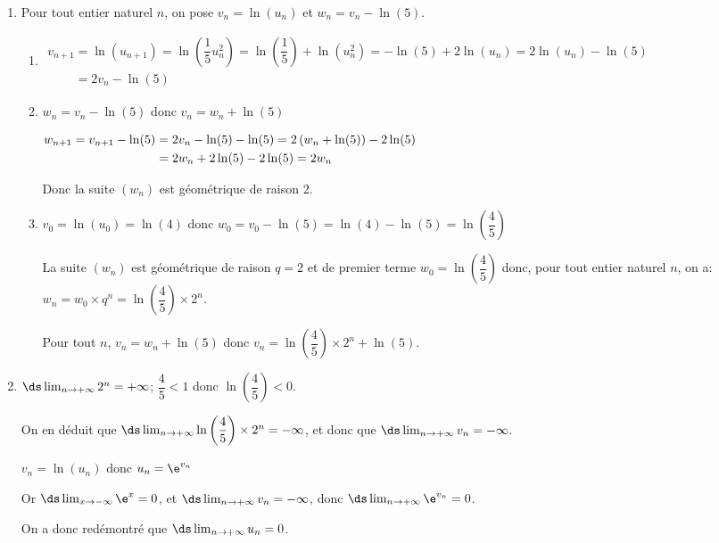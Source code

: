 \begin{enumerate}
\begin{enumerate}
	\end{enumerate}
\item Pour tout entier naturel $n$, on pose $v_n = \ln \left(u_n\right)$ et $w_n = v_n - \ln (5)$.
	\begin{enumerate}
		\item 
$\begin{gathered}v_{n+1} = \ln \left (u_{n+1}\right ) = \ln \left (\dfrac{1}{5}u_n^2\right )
= \ln \left ( \dfrac{1}{5}\right ) + \ln \left ( u_n^2 \right )
= - \ln \left (5\right ) +2 \ln \left (u_n\right )
=2 \ln\left (u_n\right ) -\ln \left (5\right )\\
\phantom{v_{n+1}}
=2 v_n -\ln \left (5\right )\end{gathered}$		
		
		\item 
$w_n = v_n - \ln (5)$ donc $v_n=w_n+ \ln(5)$

$\begin{gathered}w_{n+1} =v_{n+1} - \ln(5) = 2 v_n -\ln(5) -\ln(5)
= 2\left (w_n +\ln(5)\mathstrut\right ) -2\ln(5)\\
\phantom{w_{n+1}}
=2 w_n +2\ln(5)-2\ln(5)=2w_n\end{gathered}$		
		
Donc la suite $\left(w_n\right)$ est géométrique de raison 2.
		
		\item 
$v_0=\ln\left (u_0\right )=\ln(4)$ donc $w_0=v_0-\ln(5)=\ln(4)-\ln(5) = \ln \left (\dfrac{4}{5}\right )$

La suite $(w_n)$ est géométrique de raison $q=2$ et de premier terme $w_0=\ln\left (\dfrac{4}{5}\right )$ donc, pour tout entier naturel $n$, on a:
$w_n=w_0\times q^n = \ln\left (\dfrac{4}{5}\right ) \times 2^n$.

Pour tout $n$, $v_n=w_n +\ln(5)$ donc $v_n = \ln\left (\dfrac{4}{5}\right )\times 2^n +\ln(5)$.		
			\end{enumerate}
			
\item 
$\ds\lim_{n\to +\infty} 2^n=+\infty$;
$\dfrac{4}{5}<1$ donc $\ln\left (\dfrac{4}{5}\right )<0$.

On en déduit que $\ds\lim_{n\to +\infty} \ln\left (\dfrac{4}{5}\right )\times 2^n=-\infty$, et donc que $\ds\lim_{n\to +\infty} v_n=-\infty$.

$v_n=\ln\left (u_n\right )$ donc $u_n=\e^{v_n}$

Or $\ds\lim_{x\to -\infty} \e^{x}=0$, et $\ds\lim_{n\to +\infty} v_n=-\infty$, donc $\ds\lim_{n\to +\infty} \e^{v_n}=0$.

On a donc redémontré que $\ds\lim_{n\to +\infty} u_n=0$.


\end{enumerate}

\vspace{0.5cm}
